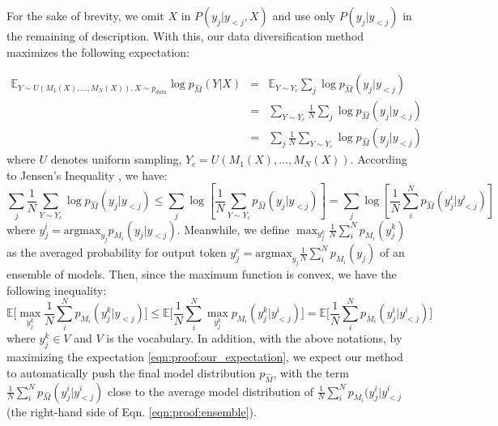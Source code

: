 \documentclass{article}
\newcommand{\E}{\mathbb{E}}
\begin{document}
For the sake of brevity, we omit $X$ in $P(y_j|y_{<j}, X)$ and use only $P(y_j|y_{<j})$ in the remaining of description. With this, our data diversification method maximizes the following expectation:

\begin{equation}
    \begin{array}{lll}
         \E_{Y\sim U({M_1}(X),...,{M_N}(X)),X\sim p_{data}} \log p_{\hat{M}}(Y|X) &=& \E_{Y\sim Y_c} \sum_{j}\log p_{\hat{M}}(y_j|y_{<j})\\ 
         &=& \sum_{Y\sim Y_c} \frac{1}{N} \sum_j \log p_{\hat{M}}(y_j|y_{<j})\\
         &=& \sum_j  \frac{1}{N} \sum_{Y\sim Y_c} \log p_{\hat{M}}(y_j|y_{<j}) \label{eqn:proof:our_expectation}
    \end{array}
\end{equation}
where $U$ denotes uniform sampling, $Y_c = U({M_1}(X),...,{M_N}(X))$. According to Jensen's Inequality \citep{jensen1906fonctions}, we have:
\begin{equation}
    \sum_j  \frac{1}{N} \sum_{Y\sim Y_c} \log p_{\hat{M}}(y_j|y_{<j}) \leq \sum_j \log [\frac{1}{N} \sum_{Y\sim Y_c} p_{\hat{M}}(y_j|y_{<j})] = \sum_j \log [\frac{1}{N} \sum_{i}^N p_{\hat{M}}(y^i_j|y_{<j}^i)]
\end{equation}
where $y^i_j = \text{argmax}_{y_j}p_{M_i}(y_j|y_{<j})$. Meanwhile, we define $\max_{y_j^k}\frac{1}{N}\sum_i^N p_{M_i}(y^k_j)$ as the averaged probability for output token $y_j^{e}=\text{argmax}_{y_j}\frac{1}{N}\sum_i^N p_{M_i}(y_j)$ of an ensemble of models. Then, since the maximum function is convex, we have the following inequality:
\begin{equation}
    \E \Big[\max_{y_j^k}\frac{1}{N}\sum_i^N p_{M_i}(y^k_j|y_{<j}) \Big] \leq \E\Big[ \frac{1}{N}\sum_i^N \max_{y_j^k} p_{M_i}(y^k_j|y_{<j}^i) \Big] = \E\Big[ \frac{1}{N}\sum_i^N p_{M_i}(y^i_j|y_{<j}^i) \Big]  \label{eqn:proof:ensemble}
\end{equation}
where $y_j^k \in V$ and $V$ is the vocabulary. In addition, with the above notations, by maximizing the expectation \ref{eqn:proof:our_expectation}, we expect our method to automatically push the final model distribution $p_{\hat{M}}$, with the term $\frac{1}{N} \sum_{i}^N p_{\hat{M}}(y^i_j|y_{<j}^i)$ close to the average model distribution of $\frac{1}{N}\sum_i^N p_{M_i}(y_j^i|y_{<j}^i$ (the right-hand side of Eqn. \ref{eqn:proof:ensemble}). 
\end{document}
